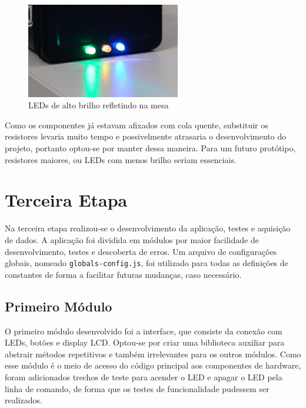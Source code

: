 \documentclass[
		12pt,				%
		openright,			%
		oneside,			%
		a4paper,			%
		chapter=TITLE,		%
		english,			%
		brazil				%
	]{abntex2}
\begin{document}
\begin{figure}[htb]
	\caption{\label{fig:led-forte-2}LEDs de alto brilho refletindo na mesa}
	\begin{center}
		\includegraphics[width=0.6\textwidth]{img/led-forte-2.jpg}
	\end{center}
\end{figure}

Como os componentes já estavam afixados com cola quente, substituir os resistores levaria muito tempo e possivelmente atrasaria o desenvolvimento do projeto, portanto optou-se por manter dessa maneira. Para um futuro protótipo, resistores maiores, ou LEDs com menos brilho seriam essenciais.

\section{Terceira Etapa}\label{sec:terceira-etapa}

Na terceira etapa realizou-se o desenvolvimento da aplicação, testes e aquisição de dados. A aplicação foi dividida em módulos por maior facilidade de desenvolvimento, testes e descoberta de erros. Um arquivo de configurações globais, nomeado \texttt{globals-config.js}, foi utilizado para todas as definições de constantes de forma a facilitar futuras mudanças, caso necessário. 

\subsection{Primeiro Módulo}\label{sec:primeiro-modulo}

O primeiro módulo desenvolvido foi a interface, que consiste da conexão com LEDs, botões e display LCD. Optou-se por criar uma biblioteca auxiliar para abstrair métodos repetitivos e também irrelevantes para os outros módulos. Como esse módulo é o meio de acesso do código principal aos componentes de hardware, foram adicionados trechos de teste para acender o LED e apagar o LED pela linha de comando, de forma que os testes de funcionalidade pudessem ser realizados.
\end{document}
